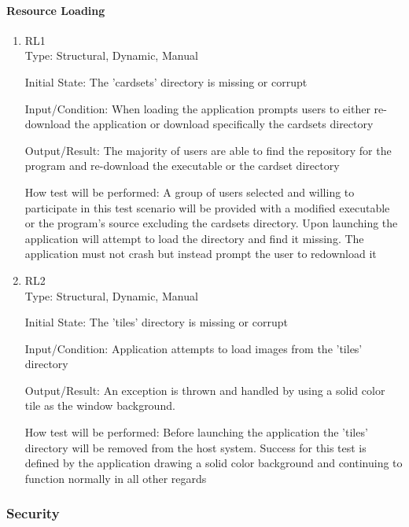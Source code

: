 \documentclass[12pt, titlepage]{article}
\begin{document}
	\paragraph{Resource Loading}
	\begin{enumerate}
		\item{RL1\\}
		Type: Structural, Dynamic, Manual
		
		Initial State: The 'cardsets' directory is missing or corrupt
		
		Input/Condition: When loading the application prompts users to either
		re-download the application or download specifically the cardsets directory
		
		Output/Result: The majority of users are able to find the repository for the
		program and re-download the executable or the cardset directory
		
		How test will be performed: A group of users selected and willing to
		participate in this test scenario will be provided with a modified executable
		or the program's source excluding the cardsets directory. Upon launching the
		application will attempt to load the directory and find it missing. The
		application must not crash but instead prompt the user to redownload it
		
		\item{RL2\\}
		Type: Structural, Dynamic, Manual
		
		Initial State: The 'tiles' directory is missing or corrupt
		
		Input/Condition: Application attempts to load images from the 'tiles' directory
		
		Output/Result: An exception is thrown and handled by using a solid color tile
		as the window background.
		
		How test will be performed: Before launching the application the 'tiles'
		directory will be removed from the host system. Success for this test is
		defined by the application drawing a solid color background and continuing
		to function normally in all other regards
	\end{enumerate}
	
	\subsubsection{Security}
\end{document}
